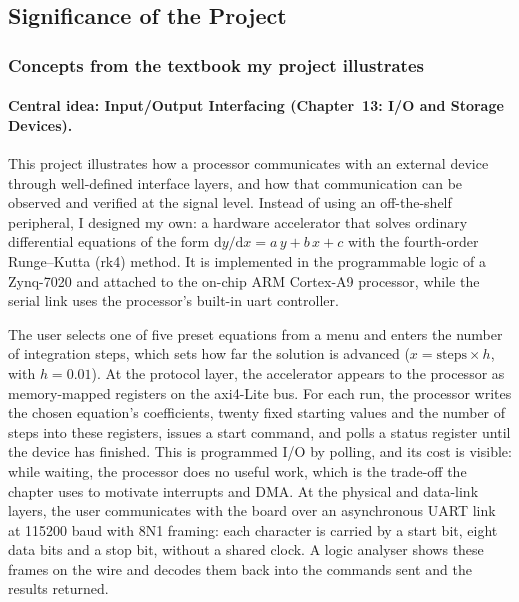 \subsection{Significance of the Project}

\subsubsection*{Concepts from the textbook my project illustrates}

\paragraph{Central idea: Input/Output Interfacing (Chapter~13: I/O and Storage Devices).}
This project illustrates how a processor communicates with an external device through
well-defined interface layers, and how that communication can be observed and verified at the
signal level. Instead of using an off-the-shelf peripheral, I designed my own: a hardware
accelerator that solves ordinary differential equations of the form
$\mathrm{d}y/\mathrm{d}x = a\,y + b\,x + c$ with the fourth-order Runge--Kutta (\gls{rk4}) method.
It is implemented in the programmable logic of a Zynq-7020 and attached to the on-chip ARM
Cortex-A9 processor, while the serial link uses the processor's built-in \gls{uart} controller.

The user selects one of five preset equations from a menu and enters the number of integration
steps, which sets how far the solution is advanced ($x = \text{steps} \times h$, with $h = 0.01$).
At the protocol layer, the accelerator appears to the processor as memory-mapped registers on the
\gls{axi}4-Lite bus. For each run, the processor writes the chosen equation's
coefficients, twenty fixed starting values and the number of steps into these registers, issues a
start command, and polls a status register until the device has finished. This is programmed I/O
by \gls{polling}, and its cost is visible: while waiting, the processor does no
useful work, which is the trade-off the chapter uses to motivate interrupts and DMA. At the
physical and data-link layers, the user communicates with the board over an asynchronous UART
link at 115200 baud with 8N1 framing: each character is carried by a start bit, eight
data bits and a stop bit, without a shared clock. A logic analyser shows these frames on the wire
and decodes them back into the commands sent and the results returned.

